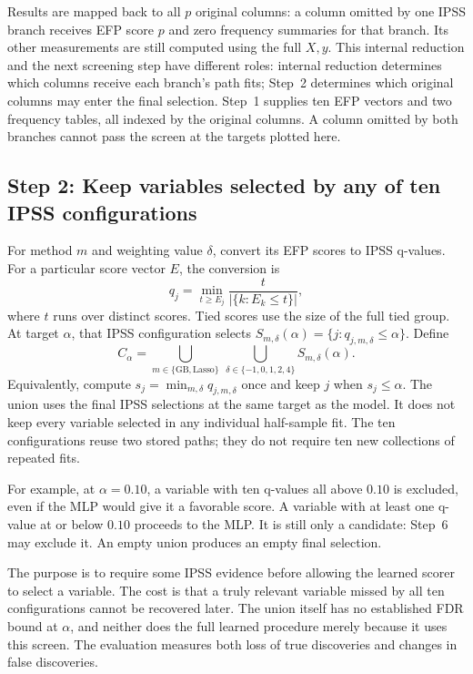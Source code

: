 \documentclass[10pt,letterpaper]{article}
\begin{document}
Results are mapped back to all $p$ original columns: a column omitted by
one IPSS branch receives EFP score $p$ and zero frequency summaries for
that branch. Its other measurements are still computed using the full $X,y$.
This internal reduction and the next screening step have different roles:
internal reduction determines which columns receive each branch's path fits;
Step~2 determines which original columns may enter the final selection.
Step~1 supplies ten EFP vectors and two frequency tables, all indexed by the
original columns. A column omitted by both branches cannot pass the screen
at the targets plotted here.

\subsection{Step 2: Keep variables selected by any of ten IPSS configurations}\label{sec:screen}
For method $m$ and weighting value $\delta$, convert its EFP scores to
IPSS q-values. For a particular score vector $E$, the conversion is
\[
 q_j=\min_{t\ge E_j}\frac{t}{|\{k:E_k\le t\}|},
\]
where $t$ runs over distinct scores. Tied scores use the size of the full
tied group. At target $\alpha$, that IPSS configuration selects
$S_{m,\delta}(\alpha)=\{j:q_{j,m,\delta}\le\alpha\}$. Define
\[
 C_\alpha=\bigcup_{m\in\{\mathrm{GB},\mathrm{Lasso}\}}
           \ \bigcup_{\delta\in\{-1,0,1,2,4\}}S_{m,\delta}(\alpha).
\]
Equivalently, compute $s_j=\min_{m,\delta}q_{j,m,\delta}$ once and keep
$j$ when $s_j\le\alpha$. The union uses the final IPSS selections at the
same target as the model. It does not keep every variable selected in any
individual half-sample fit. The ten configurations reuse two stored paths;
they do not require ten new collections of repeated fits.

For example, at $\alpha=0.10$, a variable with ten q-values all above
$0.10$ is excluded, even if the MLP would give it a favorable score.
A variable with at least one q-value at or below $0.10$ proceeds to the MLP.
It is still only a candidate: Step~6 may exclude it. An empty union produces
an empty final selection.

The purpose is to require some IPSS evidence before allowing the learned
scorer to select a variable. The cost is that a truly relevant variable
missed by all ten configurations cannot be recovered later. The union itself
has no established FDR bound at $\alpha$, and neither does the full learned
procedure merely because it uses this screen. The evaluation measures both
loss of true discoveries and changes in false discoveries.
\end{document}
